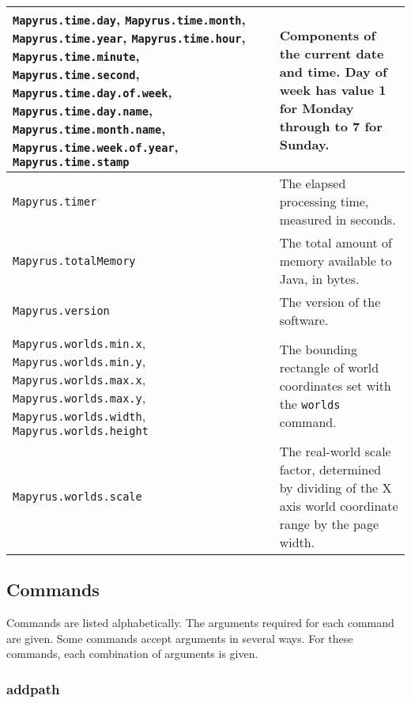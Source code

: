 \begin{longtable}{|p{6cm}|p{7cm}|}
\hline

\texttt{Mapyrus.time.day},
\texttt{Mapyrus.time.month},
\texttt{Mapyrus.time.year},
\texttt{Mapyrus.time.hour},
\texttt{Mapyrus.time.minute},
\texttt{Mapyrus.time.second},
\texttt{Mapyrus.time.day.of.week},
\texttt{Mapyrus.time.day.name},
\texttt{Mapyrus.time.month.name},
\texttt{Mapyrus.time.week.of.year},
\texttt{Mapyrus.time.stamp}
&
Components of the current date and time.
Day of week has value 1 for Monday through to 7 for Sunday.

\\

\hline

\texttt{Mapyrus.timer} &
The elapsed processing time, measured in seconds. \\

\hline

\texttt{Mapyrus.totalMemory} &
The total amount of memory available to Java, in bytes. \\

\hline

\texttt{Mapyrus.version} &
The version of the software. \\

\hline

\texttt{Mapyrus.worlds.min.x},
\texttt{Mapyrus.worlds.min.y},
\texttt{Mapyrus.worlds.max.x},
\texttt{Mapyrus.worlds.max.y},
\texttt{Mapyrus.worlds.width},
\texttt{Mapyrus.worlds.height} &
The bounding rectangle of world coordinates set with the 
\texttt{worlds} command. \\

\hline

\texttt{Mapyrus.worlds.scale} &
The real-world scale factor, determined by
dividing of the X axis world coordinate range
by the page width. \\

\end{longtable}

\subsection{Commands}

Commands are listed alphabetically.  The arguments required for each command
are given.  Some commands accept arguments in several ways.  For these
commands, each combination of arguments is given.

\subsubsection{addpath}

